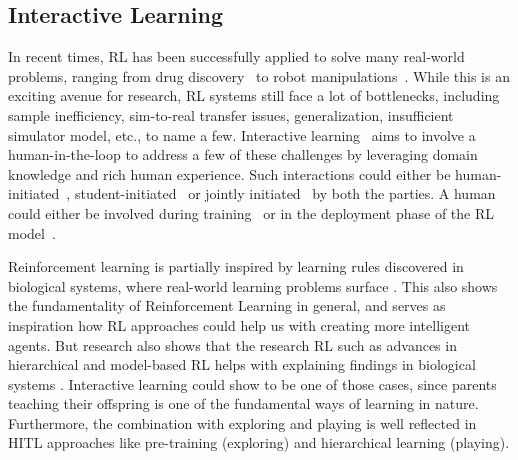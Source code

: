 \documentclass[twoside,11pt]{article}
\begin{document}
\subsection{Interactive Learning}
\label{IRLBackground}

In recent times, RL has been successfully applied to solve many real-world problems, ranging from drug discovery~\citep{popova2018deep} to robot manipulations~\citep{nguyen2019review}. While this is an exciting avenue for research, RL systems still face a lot of bottlenecks, including sample inefficiency, sim-to-real transfer issues, generalization, insufficient simulator model, etc., to name a few. Interactive learning~\citep{Arzate:2020:SurveyInteractiveRL} aims to involve a human-in-the-loop to address a few of these challenges by leveraging domain knowledge and rich human experience. Such interactions could either be human-initiated~\citep{torrey2013teaching}, student-initiated~\citep{da2020uncertainty} or jointly initiated~\citep{amir2016interactive} by both the parties. A human could either be involved during training~\citep{Knox:2008:TAMER} or in the deployment phase of the RL model~\citep{guo2021edge}. 

Reinforcement learning is partially inspired by learning rules discovered in biological systems, where real-world learning problems surface \citep{NeftciAverbeck:2019:RLBiologicalSystems}. This also shows the fundamentality of Reinforcement Learning in general, and serves as inspiration how RL approaches could help us with creating more intelligent agents. But research also shows that the research RL such as advances in hierarchical and model-based RL helps with explaining findings in biological systems \citep{ShteingartLoewenstein:2014:RLHumanBehavior}. Interactive learning could show to be one of those cases, since parents teaching their offspring is one of the fundamental ways of learning in nature. Furthermore, the combination with exploring and playing is well reflected in HITL approaches like pre-training (exploring) and hierarchical learning (playing).
\end{document}
